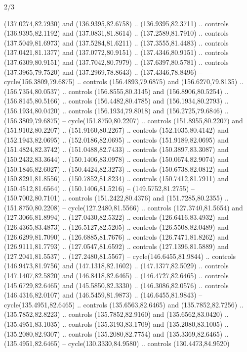 \begin{flagdescription}{2/3}
\begin{scope}[xshift=0.5\flaglength,yshift=0.5\flagwidth,scale=\flagwidth/180]
\begin{scope}[y=0.8pt, x=0.8pt, yscale=-1,shift={(-168.75,-108.75)}]
  (137.0274,82.7930) and (136.9395,82.6758) .. (136.9395,82.3711) .. controls
  (136.9395,82.1192) and (137.0831,81.8614) .. (137.2589,81.7910) .. controls
  (137.5049,81.6973) and (137.5284,81.6211) .. (137.3555,81.4483) .. controls
  (137.0421,81.1377) and (137.0772,80.9151) .. (137.4346,80.9151) .. controls
  (137.6309,80.9151) and (137.7042,80.7979) .. (137.6397,80.5781) .. controls
  (137.3965,79.7520) and (137.2969,78.8643) .. (137.4346,78.8496) --
  cycle(156.3809,79.6875) .. controls (156.4893,79.6875) and (156.6270,79.8135)
  .. (156.7354,80.0537) .. controls (156.8555,80.3145) and (156.8906,80.5254) ..
  (156.8145,80.5166) .. controls (156.4482,80.4785) and (156.1934,80.2793) ..
  (156.1934,80.0420) .. controls (156.1934,79.8018) and (156.2725,79.6846) ..
  (156.3809,79.6875) -- cycle(151.8750,80.2207) .. controls (151.8955,80.2207)
  and (151.9102,80.2207) .. (151.9160,80.2267) .. controls (152.1035,80.4142)
  and (152.1943,82.0695) .. (152.0186,82.0695) .. controls (151.9189,82.0695)
  and (151.4824,82.3742) .. (151.0488,82.7433) .. controls (150.3897,83.3087)
  and (150.2432,83.3644) .. (150.1406,83.0978) .. controls (150.0674,82.9074)
  and (150.1846,82.6027) .. (150.4424,82.3273) .. controls (150.6738,82.0812)
  and (150.8291,81.8556) .. (150.7852,81.8234) .. controls (150.7412,81.7911)
  and (150.4512,81.6564) .. (150.1406,81.5216) -- (149.5752,81.2755) --
  (150.7002,80.7101) .. controls (151.2422,80.4376) and (151.7285,80.2355) ..
  (151.8750,80.2208) -- cycle(127.2480,81.5566) .. controls (127.3740,81.5654)
  and (127.3066,81.8994) .. (127.0430,82.5322) .. controls (126.6416,83.4932)
  and (126.4365,83.4873) .. (126.5127,82.5205) .. controls (126.5508,82.0489)
  and (126.6299,81.7090) .. (126.6885,81.7676) .. controls (126.7471,81.8262)
  and (126.9111,81.7793) .. (127.0547,81.6592) .. controls (127.1396,81.5889)
  and (127.2041,81.5537) .. (127.2480,81.5567) -- cycle(146.6455,81.9844) ..
  controls (146.9473,81.9756) and (147.1318,82.1602) .. (147.1377,82.5029) ..
  controls (147.1407,82.5820) and (146.8418,82.6465) .. (146.4727,82.6465) ..
  controls (145.6729,82.6465) and (145.5850,82.3330) .. (146.3086,82.0576) ..
  controls (146.4316,82.0107) and (146.5459,81.9873) .. (146.6455,81.9843) --
  cycle(135.4951,82.6465) .. controls (135.6563,82.6465) and (135.7852,82.7256)
  .. (135.7852,82.8223) .. controls (135.7852,82.9160) and (135.6562,83.0420) ..
  (135.4951,83.1035) .. controls (135.3193,83.1709) and (135.2080,83.1005) ..
  (135.2080,82.9307) .. controls (135.2080,82.7754) and (135.3369,82.6465) ..
  (135.4951,82.6465) -- cycle(130.3330,84.9580) .. controls (130.4473,84.9520)

\end{scope}
\end{scope}
\end{flagdescription}
